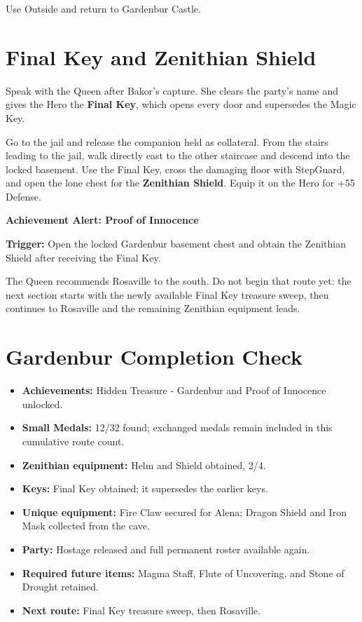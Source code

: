 \documentclass[
  american,
  10pt,
  letterpaper,
  oneside,
  open=any]{scrreprt}
\providecommand{\tightlist}{%
  \setlength{\itemsep}{0pt}\setlength{\parskip}{0pt}}
\begin{document}
Use Outside and return to Gardenbur Castle.

\section{Final Key and Zenithian
Shield}\label{final-key-and-zenithian-shield}

Speak with the Queen after Bakor's capture. She clears the party's name
and gives the Hero the \textbf{Final Key}, which opens every door and
supersedes the Magic Key.

Go to the jail and release the companion held as collateral. From the
stairs leading to the jail, walk directly east to the other staircase
and descend into the locked basement. Use the Final Key, cross the
damaging floor with StepGuard, and open the lone chest for the
\textbf{Zenithian Shield}. Equip it on the Hero for +55 Defense.

\begin{achievementalert}

\textbf{Achievement Alert: Proof of Innocence}

\textbf{Trigger:} Open the locked Gardenbur basement chest and obtain
the Zenithian Shield after receiving the Final Key.

\end{achievementalert}

The Queen recommends Rosaville to the south. Do not begin that route
yet: the next section starts with the newly available Final Key treasure
sweep, then continues to Rosaville and the remaining Zenithian equipment
leads.

\section{Gardenbur Completion Check}\label{gardenbur-completion-check}

\begin{itemize}
\tightlist
\item
  \textbf{Achievements:} Hidden Treasure - Gardenbur and Proof of
  Innocence unlocked.
\item
  \textbf{Small Medals:} 12/32 found; exchanged medals remain included
  in this cumulative route count.
\item
  \textbf{Zenithian equipment:} Helm and Shield obtained, 2/4.
\item
  \textbf{Keys:} Final Key obtained; it supersedes the earlier keys.
\item
  \textbf{Unique equipment:} Fire Claw secured for Alena; Dragon Shield
  and Iron Mask collected from the cave.
\item
  \textbf{Party:} Hostage released and full permanent roster available
  again.
\item
  \textbf{Required future items:} Magma Staff, Flute of Uncovering, and
  Stone of Drought retained.
\item
  \textbf{Next route:} Final Key treasure sweep, then Rosaville.
\end{itemize}
\end{document}
